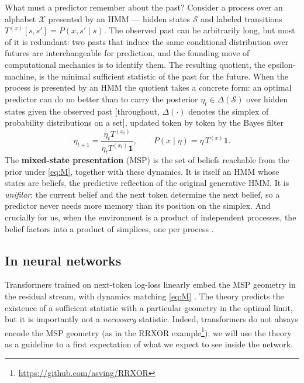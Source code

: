 \documentclass[11pt]{article}
\begin{document}
What must a predictor remember about the past? Consider a process over an alphabet $\mathcal X$ presented by an HMM --- hidden states $\mathcal S$ and labeled transitions $T^{(x)}[s,s'] = P(x, s' \mid s)$. The observed past can be arbitrarily long, but most of it is redundant: two pasts that induce the same conditional distribution over futures are interchangeable for prediction, and the founding move of computational mechanics \citep{crutchfield1989, shalizi2001} is to identify them. The resulting quotient, the epsilon-machine, is the minimal sufficient statistic of the past for the future. When the process is presented by an HMM the quotient takes a concrete form: an optimal predictor can do no better than to carry the posterior $\eta_t \in \Delta(\mathcal S)$ over hidden states given the observed past [throughout, $\Delta(\cdot)$ denotes the simplex of probability distributions on a set], updated token by token by the Bayes filter
\begin{equation}
\tag{M}\label{eq:M}
\eta_{t+1} = \frac{\eta_t T^{(x_t)}}{\eta_t T^{(x_t)} \mathbf 1},
\qquad
P(x\mid\eta) = \eta\, T^{(x)} \mathbf 1 .
\end{equation}
The \textbf{mixed-state presentation} (MSP) \citep{riechers2018} is the set of beliefs reachable from the prior under \eqref{eq:M}, together with these dynamics. It is itself an HMM whose states are beliefs, the predictive reflection of the original generative HMM. It is \emph{unifilar}: the current belief and the next token determine the next belief, so a predictor never needs more memory than its position on the simplex. And crucially for us, when the environment is a product of independent processes, the belief factors into a product of simplices, one per process \citep{factored2026}.


\subsection*{In neural networks}

Transformers trained on next-token log-loss linearly embed the MSP geometry in the residual stream, with dynamics matching \eqref{eq:M} \citep{shai2024, piotrowski2025}. The theory predicts the existence of a sufficient statistic with a particular geometry in the optimal limit, but it is importantly not a \emph{necessary} statistic. Indeed, transformers do not always encode the MSP geometry (as in the RRXOR example\footnote{\url{https://github.com/asving/RRXOR}}); we will use the theory as a guideline to a first expectation of what we expect to see inside the network.
\end{document}
